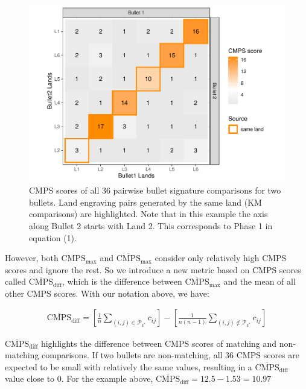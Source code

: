 \begin{Schunk}
\begin{figure}

{\centering \includegraphics[width=.7\textwidth]{ju-hofmann_files/figure-latex/tiles-1} 

}

\caption[CMPS scores of all 36 pairwise bullet signature comparisons for two bullets]{CMPS scores of all 36 pairwise bullet signature comparisons for two bullets. Land engraving pairs generated by the same land (KM comparisons) are highlighted. Note that in this example the axis along Bullet 2 starts with Land 2. This corresponds to Phase 1 in equation (1).}\label{fig:tiles}
\end{figure}
\end{Schunk}

However, both \(\mathrm{CMPS_{max}}\) and
\(\mathrm{\overline{CMPS}_{max}}\) consider only relatively high CMPS
scores and ignore the rest. So we introduce a new metric based on CMPS
scores called \(\mathrm{\overline{CMPS}_{diff}}\), which is the
difference between \(\mathrm{\overline{CMPS}_{max}}\) and the mean of
all other CMPS scores. With our notation above, we have:

\begin{align}
\mathrm{\overline{CMPS}_{diff}} = \left[  \frac{1}{n} \sum_{(i,j) \in \mathcal{P}_{k^*}} c_{ij}\right] - \left[  \frac{1}{n(n-1)} \sum_{(i,j) \notin \mathcal{P}_{k^*}} c_{ij}\right]
\end{align}

\(\mathrm{\overline{CMPS}_{diff}}\) highlights the difference between
CMPS scores of matching and non-matching comparisons. If two bullets are
non-matching, all 36 CMPS scores are expected to be small with
relatively the same values, resulting in a
\(\mathrm{\overline{CMPS}_{diff}}\) value close to 0. For the example
above, \(\mathrm{\overline{CMPS}_{diff}} = 12.5 - 1.53 = 10.97\)

